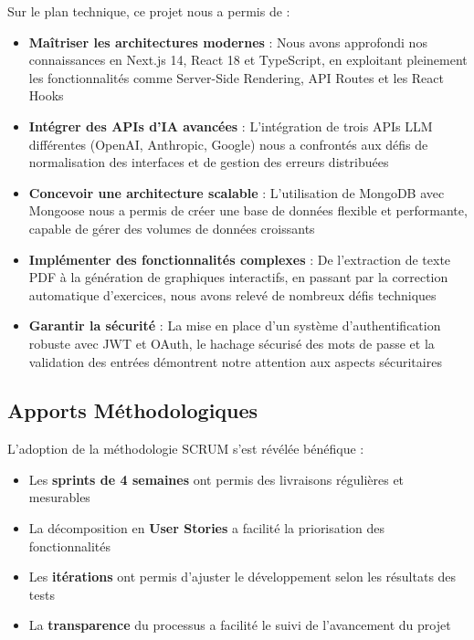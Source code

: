 Sur le plan technique, ce projet nous a permis de :

\begin{itemize}
    \item \textbf{Maîtriser les architectures modernes} : Nous avons approfondi nos connaissances en Next.js 14, React 18 et TypeScript, en exploitant pleinement les fonctionnalités comme Server-Side Rendering, API Routes et les React Hooks
    
    \item \textbf{Intégrer des APIs d'IA avancées} : L'intégration de trois APIs LLM différentes (OpenAI, Anthropic, Google) nous a confrontés aux défis de normalisation des interfaces et de gestion des erreurs distribuées
    
    \item \textbf{Concevoir une architecture scalable} : L'utilisation de MongoDB avec Mongoose nous a permis de créer une base de données flexible et performante, capable de gérer des volumes de données croissants
    
    \item \textbf{Implémenter des fonctionnalités complexes} : De l'extraction de texte PDF à la génération de graphiques interactifs, en passant par la correction automatique d'exercices, nous avons relevé de nombreux défis techniques
    
    \item \textbf{Garantir la sécurité} : La mise en place d'un système d'authentification robuste avec JWT et OAuth, le hachage sécurisé des mots de passe et la validation des entrées démontrent notre attention aux aspects sécuritaires
\end{itemize}

\subsection*{Apports Méthodologiques}

L'adoption de la méthodologie SCRUM s'est révélée bénéfique :

\begin{itemize}
    \item Les \textbf{sprints de 4 semaines} ont permis des livraisons régulières et mesurables
    \item La décomposition en \textbf{User Stories} a facilité la priorisation des fonctionnalités
    \item Les \textbf{itérations} ont permis d'ajuster le développement selon les résultats des tests
    \item La \textbf{transparence} du processus a facilité le suivi de l'avancement du projet
\end{itemize}

